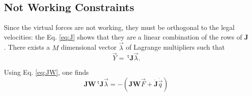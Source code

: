 \documentclass[aps,twocolumn]{revtex4}
\newcommand{\mymat}[1]{\boldsymbol{#1}}
\newcommand{\mytrn}[1]{{\!\!~^{\mathsf{t}}{#1}}}
\begin{document}
\subsection{Not Working Constraints}
Since the virtual forces are not working, they must be orthogonal to the legal velocities: the Eq. \eqref{eq:J}
shows that they are a linear combination of the rows of $\mymat{J}$.
There exists a $M$ dimensional vector $\vec{\lambda}$ 
of Lagrange multipliers
such that
\begin{equation}
	\vec{Y} = \mytrn{\mymat{J}}\vec{\lambda}.
\end{equation}

Using Eq. \eqref{eq:JW}, one finds
\begin{equation}
	\mymat{J}\mymat{W} \mytrn{\mymat{J}}\vec{\lambda} = -\left(\mymat{J}\mymat{W}\vec{F} + \dot{\mymat{J}}\dot{\vec{q}}\right)
\end{equation}
\end{document}
